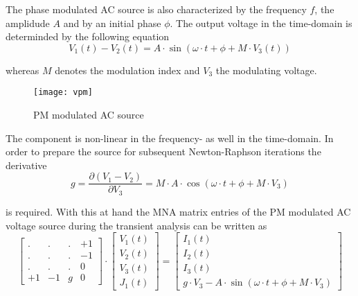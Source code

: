 The phase modulated AC source is also characterized by the frequency
$f$, the amplidude $A$ and by an initial phase $\phi$.  The output
voltage in the time-domain is determinded by the following equation
\begin{equation}
V_1\left(t\right) - V_2\left(t\right) = A\cdot\sin{\left(\omega\cdot t + \phi + M\cdot V_3\left(t\right)\right)}
\end{equation}

whereas $M$ denotes the modulation index and $V_3$ the modulating
voltage.

\begin{figure}[ht]
\begin{center}
\texttt{[image: vpm]}
\end{center}
\label{fig:VPM}
\caption{PM modulated AC source}
\end{figure}
\FloatBarrier

The component is non-linear in the frequency- as well in the
time-domain.  In order to prepare the source for subsequent
Newton-Raphson iterations the derivative
\begin{equation}
g = \dfrac{\partial \left(V_1 - V_2\right)}{\partial V_3} = M\cdot A\cdot\cos{\left(\omega\cdot t + \phi + M\cdot V_3\right)}
\end{equation}

is required.  With this at hand the MNA matrix entries of the PM
modulated AC voltage source during the transient analysis can be
written as
\begin{equation}
\begin{bmatrix}
. & . & . & +1\\
. & . & . & -1\\
. & . & . & 0\\
+1 & -1 & g & 0
\end{bmatrix}
\cdot
\begin{bmatrix}
V_1\left(t\right)\\
V_2\left(t\right)\\
V_3\left(t\right)\\
J_1\left(t\right)
\end{bmatrix}
=
\begin{bmatrix}
I_1\left(t\right)\\
I_2\left(t\right)\\
I_3\left(t\right)\\
g\cdot V_3 - A\cdot \sin{\left(\omega\cdot t + \phi + M\cdot V_3\right)}
\end{bmatrix}
\end{equation}

